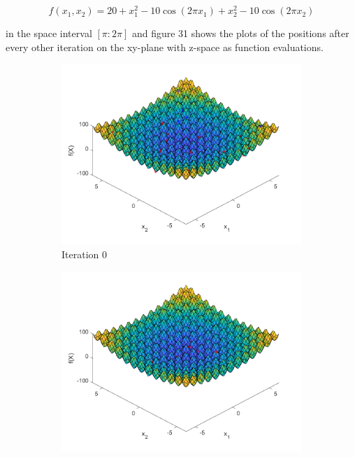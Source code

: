 $$
  f(x_1, x_2) = 20 + x_1^2 - 10 \cos(2\pi x_1) + x_2^2 - 10 \cos(2\pi x_2)
$$

in the space interval $[\pi:2\pi]$ and figure 31 shows the plots of the positions after every other iteration on the xy-plane with z-space as function evaluations.

\begin{figure}
  \begin{subfigure}[b]{0.4\textwidth}
    \includegraphics[width=\textwidth]{img/smpl/rast2d/loa-iter-0}
    \caption{Iteration 0}
    \label{fig:s3-iter-0}
  \end{subfigure}
  \begin{subfigure}[b]{0.4\textwidth}
    \includegraphics[width=\textwidth]{img/smpl/rast2d/loa-iter-7}

\end{subfigure}
\end{figure}
